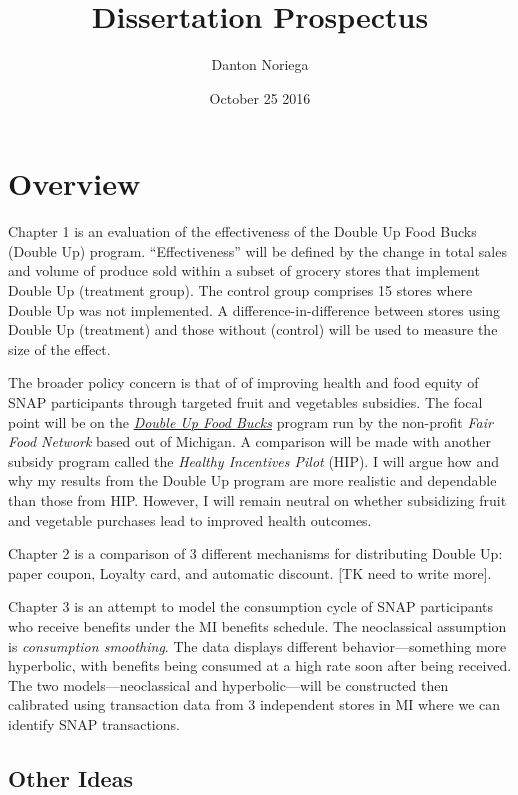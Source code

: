 \documentclass[11pt,letterpaperpaper,]{book}
\title{Dissertation Prospectus}
\author{Danton Noriega}
\date{October 25 2016}
\begin{document}
\maketitle

{
\setcounter{tocdepth}{1}
\tableofcontents
}
\chapter*{Overview}\label{overview}

Chapter 1 is an evaluation of the effectiveness of the Double Up Food
Bucks (Double Up) program. ``Effectiveness'' will be defined by the
change in total sales and volume of produce sold within a subset of
grocery stores that implement Double Up (treatment group). The control
group comprises 15 stores where Double Up was not implemented. A
difference-in-difference between stores using Double Up (treatment) and
those without (control) will be used to measure the size of the effect.

The broader policy concern is that of of improving health and food
equity of SNAP participants through targeted fruit and vegetables
subsidies. The focal point will be on the
\href{http://www.doubleupfoodbucks.org/}{\emph{Double Up Food Bucks}}
program run by the non-profit \emph{Fair Food Network} based out of
Michigan. A comparison will be made with another subsidy program called
the \emph{Healthy Incentives Pilot} (HIP). I will argue how and why my
results from the Double Up program are more realistic and dependable
than those from HIP. However, I will remain neutral on whether
subsidizing fruit and vegetable purchases lead to improved health
outcomes.

Chapter 2 is a comparison of 3 different mechanisms for distributing
Double Up: paper coupon, Loyalty card, and automatic discount. {[}TK
need to write more{]}.

Chapter 3 is an attempt to model the consumption cycle of SNAP
participants who receive benefits under the MI benefits schedule. The
neoclassical assumption is \emph{consumption smoothing}. The data
displays different behavior---something more hyperbolic, with benefits
being consumed at a high rate soon after being received. The two
models---neoclassical and hyperbolic---will be constructed then
calibrated using transaction data from 3 independent stores in MI where
we can identify SNAP transactions.

\section{Other Ideas}\label{other-ideas}
\end{document}
